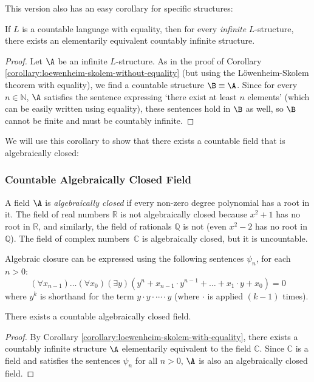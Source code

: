 This version also has an easy corollary for specific structures:

\begin{corollary}\label{corollary:loewenheim-skolem-with-equality}
    If $L$ is a countable language with equality, then for every \emph{infinite} $L$-structure, there exists an elementarily equivalent countably infinite structure.
\end{corollary}
\begin{proof}
    Let $\A$ be an infinite $L$-structure. As in the proof of Corollary \ref{corollary:loewenheim-skolem-without-equality} (but using the Löwenheim-Skolem theorem with equality), we find a countable structure $\B\equiv\A$. Since for every $n\in\mathbb{N}$, $\A$ satisfies the sentence expressing `there exist at least $n$ elements' (which can be easily written using equality), these sentences hold in $\B$ as well, so $\B$ cannot be finite and must be countably infinite.
\end{proof}

We will use this corollary to show that there exists a countable field that is algebraically closed:

\subsubsection*{Countable Algebraically Closed Field}

A field $\A$ is \emph{algebraically closed} if every non-zero degree polynomial has a root in it. The field of real numbers $\mathbb{R}$ is not algebraically closed because $x^2+1$ has no root in $\mathbb{R}$, and similarly, the field of rationals $\mathbb{Q}$ is not (even $x^2-2$ has no root in $\mathbb{Q}$). The field of complex numbers~$\mathbb{C}$ is algebraically closed, but it is uncountable.

Algebraic closure can be expressed using the following sentences $\psi_n$, for each $n>0$:
$$
(\forall x_{n-1})\dots(\forall x_0)(\exists y)(y^n+x_{n-1}\cdot y^{n-1}+\dots+x_1\cdot y + x_0) = 0
$$
where $y^k$ is shorthand for the term $y \cdot y \cdot \cdots \cdot y$ (where $\cdot$ is applied $(k-1)$ times).

\begin{corollary}
    There exists a countable algebraically closed field.
\end{corollary}
\begin{proof}
    By Corollary \ref{corollary:loewenheim-skolem-with-equality}, there exists a countably infinite structure $\A$ elementarily equivalent to the field $\mathbb{C}$. Since $\mathbb{C}$ is a field and satisfies the sentences $\psi_n$ for all $n>0$, $\A$ is also an algebraically closed field.
\end{proof}

